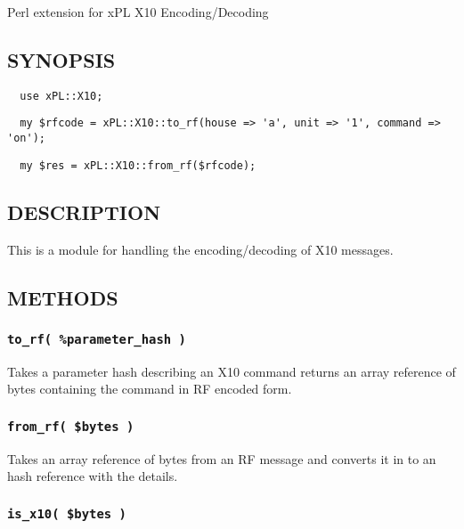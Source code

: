 Perl extension for xPL X10 Encoding/Decoding

\subsection*{SYNOPSIS\label{xPL::X10_SYNOPSIS}}
\begin{verbatim}
  use xPL::X10;
\end{verbatim}
\begin{verbatim}
  my $rfcode = xPL::X10::to_rf(house => 'a', unit => '1', command => 'on');
\end{verbatim}
\begin{verbatim}
  my $res = xPL::X10::from_rf($rfcode);
\end{verbatim}
\subsection*{DESCRIPTION\label{xPL::X10_DESCRIPTION}}


This is a module for handling the encoding/decoding of X10 messages.

\subsection*{METHODS\label{xPL::X10_METHODS}}
\subsubsection*{\texttt{to\_rf( \%parameter\_hash )}\label{xPL::X10_to_rf_parameter_hash_}}


Takes a parameter hash describing an X10 command returns an array
reference of bytes containing the command in RF encoded form.

\subsubsection*{\texttt{from\_rf( \$bytes )}\label{xPL::X10_from_rf_bytes_}}


Takes an array reference of bytes from an RF message and converts it
in to an hash reference with the details.

\subsubsection*{\texttt{is\_x10( \$bytes )}\label{xPL::X10_is_x10_bytes_}}


